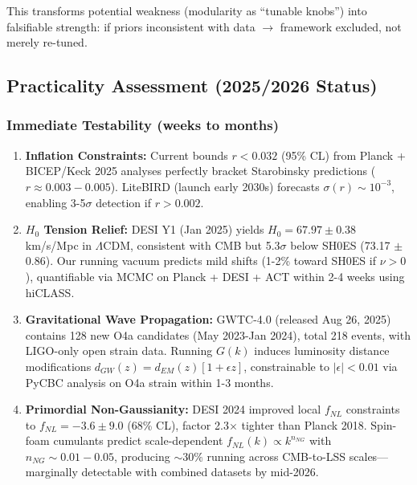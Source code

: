 \documentclass[12pt,a4paper]{article}
\begin{document}
This transforms potential weakness (modularity as ``tunable knobs'') into falsifiable strength: if priors inconsistent with data \(\to\) framework excluded, not merely re-tuned.

\subsection{Practicality Assessment (2025/2026 Status)}

\subsubsection{Immediate Testability (weeks to months)}

\begin{enumerate}
\item \textbf{Inflation Constraints:} Current bounds \(r < 0.032\) (95\% CL) from Planck + BICEP/Keck 2025 analyses perfectly bracket Starobinsky predictions (\(r \approx 0.003-0.005\)). LiteBIRD (launch early 2030s) forecasts \(\sigma(r) \sim 10^{-3}\), enabling 3-5\(\sigma\) detection if \(r > 0.002\).

\item \textbf{\(H_0\) Tension Relief:} DESI Y1 (Jan 2025) yields \(H_0 = 67.97 \pm 0.38\) km/s/Mpc in \(\Lambda\)CDM, consistent with CMB but 5.3\(\sigma\) below SH0ES (73.17 \(\pm\) 0.86). Our running vacuum predicts mild shifts (1-2\% toward SH0ES if \(\nu > 0\)), quantifiable via MCMC on Planck + DESI + ACT within 2-4 weeks using hiCLASS.

\item \textbf{Gravitational Wave Propagation:} GWTC-4.0 (released Aug 26, 2025) contains 128 new O4a candidates (May 2023-Jan 2024), total 218 events, with LIGO-only open strain data. Running \(G(k)\) induces luminosity distance modifications \(d_{GW}(z) = d_{EM}(z)[1 + \epsilon z]\), constrainable to \(|\epsilon| < 0.01\) via PyCBC analysis on O4a strain within 1-3 months.

\item \textbf{Primordial Non-Gaussianity:} DESI 2024 improved local \(f_{NL}\) constraints to \(f_{NL} = -3.6 \pm 9.0\) (68\% CL), factor 2.3\(\times\) tighter than Planck 2018. Spin-foam cumulants predict scale-dependent \(f_{NL}(k) \propto k^{n_{NG}}\) with \(n_{NG} \sim 0.01-0.05\), producing \(\sim 30\%\) running across CMB-to-LSS scales—marginally detectable with combined datasets by mid-2026.
\end{enumerate}
\end{document}
